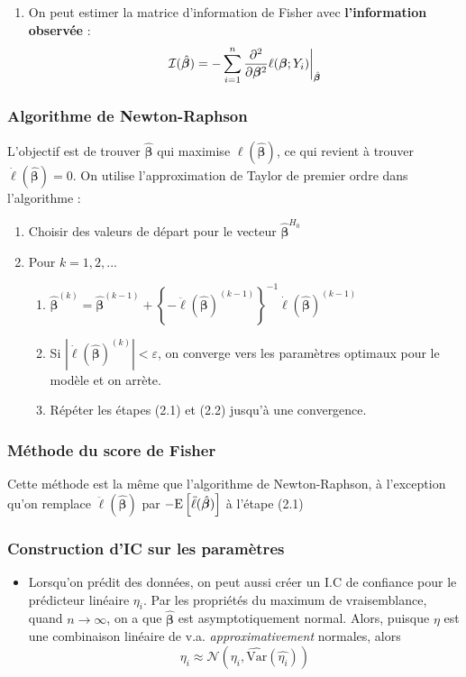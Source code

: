 \documentclass[10pt, french]{article}
\begin{document}
\begin{multicols*}{3}
\begin{enumerate}[label=\faAngleRight]
\item On peut estimer la matrice d'information  de Fisher avec \textbf{l'information observée} :
\[\mathcal{I}(\hat{\bm{\beta}}) = - \sum_{i=1}^{n} \frac{\partial^2}{\partial \bm{\beta}^2} \ell(\bm{\beta} ; Y_i)  \biggr \rvert_{\hat{\bm{\beta}}} \]
\end{enumerate}

\subsubsection*{Algorithme de Newton-Raphson}
L'objectif est de trouver $\hat{\bm{\beta}}$ qui maximise $\ell(\hat{\bm{\beta}})$, ce qui revient à trouver $\dot{\ell}(\hat{\bm{\beta}}) = 0$. On utilise l'approximation de Taylor de premier ordre dans l'algorithme : 
\begin{enumerate}[label = (\arabic*)]
\item Choisir des valeurs de départ pour le vecteur $\hat{\bm{\beta}}^{H_0}$
\item Pour $k = 1, 2, ...$
\begin{enumerate}[label = (2.\arabic*)]
	\item $\hat{\bm{\beta}}^{(k)} = \hat{\bm{\beta}}^{(k-1)} +  \left \{ - \ddot{\ell}(\hat{\bm{\beta}})^{(k-1)} \right \}^{-1} \dot{\ell}(\hat{\bm{\beta}})^{(k-1)}$
	\item Si $|\dot{\ell}(\hat{\bm{\beta}})^{(k)}| < \varepsilon $, on converge vers les paramètres optimaux pour le modèle et on arrète.
	\item Répéter les étapes (2.1) et (2.2) jusqu'à une convergence.
\end{enumerate}
\end{enumerate}

\subsubsection*{Méthode du score de Fisher}
Cette méthode est la même que l'algorithme de Newton-Raphson, à l'exception qu'on remplace $\ddot{\ell}(\hat{\bm{\beta}})$ par $- \mathrm{E} \left[ \ddot{\ell}(\hat{\bm{\beta}}) \right]$ à l'étape (2.1)

\subsubsection*{Construction d'IC sur les paramètres}
\begin{itemize}
\item Lorsqu'on prédit des données, on peut aussi créer un I.C de confiance pour le prédicteur linéaire $\eta_i$. Par les propriétés du maximum de vraisemblance, quand $n \to \infty$, on a que $\hat{\bm{\beta}}$ est asymptotiquement normal. Alors, puisque $\eta$ est une combinaison linéaire de v.a. \emph{approximativement} normales, alors
\[\eta_i \approx \mathcal{N} \left( \eta_i,  \widehat{\mathrm{Var}}(\hat{\eta_i})   \right) \]


\end{itemize}
\end{multicols*}
\end{document}
